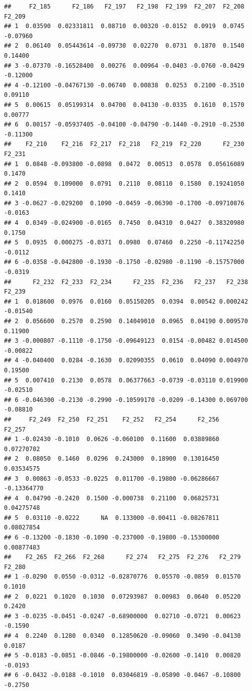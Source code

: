 \documentclass[]{article}
\begin{document}
\begin{verbatim}
##     F2_185      F2_186   F2_197   F2_198  F2_199  F2_207  F2_208   F2_209
## 1  0.03590  0.02331811  0.08710  0.00320 -0.0152  0.0919  0.0745 -0.07960
## 2  0.06140  0.05443614 -0.09730  0.02270  0.0731  0.1870  0.1540  0.14400
## 3 -0.07370 -0.16528400  0.00276  0.00964 -0.0403 -0.0760 -0.0429 -0.12000
## 4 -0.12100 -0.04767130 -0.06740  0.00838  0.0253  0.2100 -0.3510  0.09110
## 5  0.00615  0.05199314  0.04700  0.04130 -0.0335  0.1610  0.1570  0.00777
## 6  0.00157 -0.05937405 -0.04100 -0.04790 -0.1440 -0.2910 -0.2530 -0.11300
##    F2_210    F2_216  F2_217  F2_218   F2_219  F2_220      F2_230  F2_231
## 1  0.0848 -0.093800 -0.0898  0.0472  0.00513  0.0578  0.05616089  0.1470
## 2  0.0594  0.109000  0.0791  0.2110  0.08110  0.1580  0.19241050  0.1410
## 3 -0.0627 -0.029200  0.1090 -0.0459 -0.06390 -0.1700 -0.09710876 -0.0163
## 4  0.0349 -0.024900 -0.0165  0.7450  0.04310  0.0427  0.38320980  0.1750
## 5  0.0935  0.000275 -0.0371  0.0980  0.07460  0.2250 -0.11742250 -0.0112
## 6 -0.0358 -0.042800 -0.1930 -0.1750 -0.02980 -0.1190 -0.15757000 -0.0319
##      F2_232  F2_233  F2_234      F2_235  F2_236   F2_237   F2_238   F2_239
## 1  0.018600  0.0976  0.0160  0.05150205  0.0394  0.00542 0.000242 -0.01540
## 2  0.056600  0.2570  0.2590  0.14049010  0.0965  0.04190 0.009570  0.11900
## 3 -0.000807 -0.1110 -0.1750 -0.09649123  0.0154 -0.00482 0.014500 -0.00822
## 4 -0.040400  0.0284 -0.1630  0.02090355  0.0610  0.04090 0.004970  0.19500
## 5  0.007410  0.2130  0.0578  0.06377663 -0.0739 -0.03110 0.019900 -0.02510
## 6 -0.046300 -0.2130 -0.2990 -0.10599170 -0.0209 -0.14300 0.069700 -0.08810
##     F2_249  F2_250  F2_251    F2_252   F2_254      F2_256      F2_257
## 1 -0.02430 -0.1010  0.0626 -0.060100  0.11600  0.03889860  0.07270702
## 2  0.08050  0.1460  0.0296  0.243000  0.18900  0.13016450  0.03534575
## 3  0.00863 -0.0533 -0.0225  0.011700 -0.19800 -0.06286667 -0.13364770
## 4  0.04790 -0.2420  0.1500 -0.000738  0.21100  0.06825731  0.04275748
## 5  0.03110 -0.0222      NA  0.133000 -0.00411 -0.08267811  0.08027854
## 6 -0.13200 -0.1830 -0.1090 -0.237000 -0.19800 -0.15300000  0.00877483
##    F2_265  F2_266  F2_268      F2_274   F2_275  F2_276   F2_279  F2_280
## 1 -0.0290  0.0550 -0.0312 -0.02870776  0.05570 -0.0859  0.01570  0.1010
## 2  0.0221  0.1020  0.1030  0.07293987  0.00983  0.0640  0.05220  0.2420
## 3 -0.0235 -0.0451 -0.0247 -0.68900000  0.02710 -0.0721  0.00623 -0.1590
## 4  0.2240  0.1280  0.0340  0.12850620 -0.09060  0.3490 -0.04130  0.0187
## 5 -0.0183 -0.0851 -0.0846 -0.19800000 -0.02600 -0.1410  0.00820 -0.0193
## 6 -0.0432 -0.0188 -0.1010  0.03046819 -0.05890 -0.0467 -0.10800 -0.2750

\end{verbatim}
\end{document}
